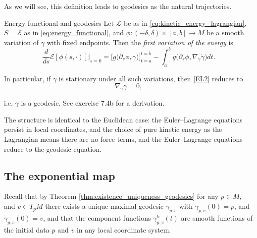 As we will see, this definition leads to geodesics as the natural trajectories.





\begin{colexample}{Energy functional and geodesics}{}
Let $\mathcal{L}$ be as in \eqref{eq:kinetic_energy_lagrangian}, $S=\mathcal{E}$ as in \eqref{eq:energy_functional}, and $\phi:(-\delta,\delta)\times[a,b]\to M$ be a smooth variation of $\gamma$ with fixed endpoints. Then the \emph{first variation of the energy} is
$$
\frac{d}{ds}\mathcal{E}[\phi(s,\cdot)]\Big|_{s=0}
=
\Big[ g\big(\partial_s\phi,\dot\gamma\big)\Big]_{t=a}^{t=b}
-\int_a^b g\big(\partial_s\phi,\nabla_{\dot\gamma}\dot\gamma\big)dt.
$$

In particular, if $\gamma$ is stationary under all such variations, then \eqref{EL2} reduces to
\begin{equation}
    \nabla_{\dot\gamma}\dot\gamma = 0,\tag{EL3}
\end{equation}

i.e. $\gamma$ is a geodesic. See exercise 7.4b for a derivation.
\end{colexample}

The structure is identical to the Euclidean case: the Euler--Lagrange equations persist in local coordinates, and the choice of pure kinetic energy as the Lagrangian means there are no force terms, and the Euler--Lagrange equations reduce to the geodesic equation.























\subsection{The exponential map}

Recall that by Theorem \ref{thm:existence_uniqueness_geodesics} for any $p \in M$, and $v \in T_p M$ there exists a unique maximal geodesic $\gamma_{p,v}$ with $\gamma_{p,v}(0) = p$, and $\dot{\gamma}_{p,v}(0) = v$, and that the component functions $\gamma_{p,v}^k (t)$ are smooth functions of the initial data $p$ and $v$ in any local coordinate system.

